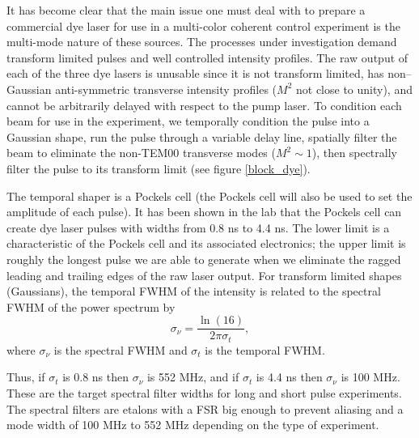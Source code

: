It has become clear that the main issue one must deal with to prepare a commercial dye laser for use in a multi-color coherent control experiment is the multi-mode nature of these sources. The processes under investigation demand transform limited pulses \cite{Corless:1997a} and well controlled intensity profiles. The raw output of each of the three dye lasers is unusable since it is not transform limited, has non--Gaussian anti-symmetric transverse intensity profiles ($M^2$ not close to unity), and cannot be arbitrarily delayed with respect to the pump laser. To condition each beam for use in the experiment, we temporally condition the pulse into a Gaussian shape, run the pulse through a variable delay line, spatially filter the beam to eliminate the non-TEM00 transverse modes ($M^2 \sim 1$), then spectrally filter the pulse to its transform limit (see figure \ref{block_dye}).


The temporal shaper is a Pockels cell (the Pockels cell will also be used to set the amplitude of each pulse). It has been shown in the lab that the Pockels cell can create dye laser pulses with widths from 0.8 ns to 4.4 ns. The lower limit is a characteristic of the Pockels cell and its associated electronics; the upper limit is roughly the longest pulse we are able to generate when we eliminate the ragged leading and trailing edges of the raw laser output. For transform limited shapes (Gaussians), the temporal FWHM of the intensity is related to the spectral FWHM of the power spectrum by
\begin{equation}
\boxed{
\sigma_\nu
=
\frac
{\ln(16)}
{2\pi\sigma_t},
\label{FWHM power}
}
\end{equation}
where $\sigma_\nu$ is the spectral FWHM and $\sigma_t$ is the temporal FWHM.

Thus, if $\sigma_t$ is 0.8 ns then $\sigma_\nu$ is 552 MHz, and if $\sigma_t$ is 4.4 ns then $\sigma_\nu$ is 100 MHz. These are the target spectral filter widths for long and short pulse experiments. The spectral filters are etalons with a FSR big enough to prevent aliasing and a mode width of 100 MHz to 552 MHz depending on the type of experiment.

